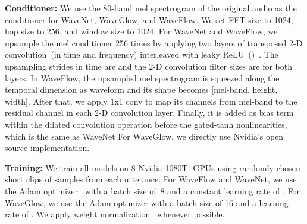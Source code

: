 \documentclass{article}
\begin{document}
\vspace{-.3em}
{\bf Conditioner:}
We use the 80-band mel spectrogram of the original audio as the conditioner for WaveNet, WaveGlow, and WaveFlow.
We set FFT size to 1024, hop size to 256, and window size to 1024.
For WaveNet and WaveFlow, we upsample the mel conditioner 256 times by applying two layers of transposed 2-D convolution~(in time and frequency) interleaved with leaky ReLU~()~\citep{ping2018clarinet}.
The upsampling strides in time are  and the 2-D convolution filter sizes are  for both layers.
In WaveFlow, the upsampled mel spectrogram is squeezed along the temporal dimension as waveform and its shape becomes [mel-band, height, width]. After that, we apply 1x1 conv to map its channels from mel-band to the residual channel in each 2-D convolution layer. Finally, it is added as bias term within the dilated convolution operation before the gated-tanh nonlinearities, which is the same as WaveNet
For WaveGlow, we directly use Nvidia's open source implementation.

\vspace{-.3em}
{\bf Training:} 
We train all models on 8 Nvidia 1080Ti GPUs using
randomly chosen short clips of  samples from each utterance.
For WaveFlow and WaveNet, we use the Adam optimizer~\citep{kingma2014adam} with a batch size of~8 and a constant learning rate of .
For WaveGlow, we use the Adam optimizer with a batch size of 16 and a learning rate of .
We apply weight normalization~\citep{salimans2016weight}  whenever possible.

\vspace{-.2em}
\end{document}
